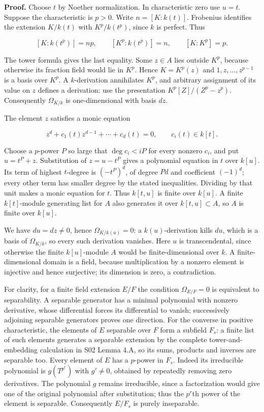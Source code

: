 \documentclass[11pt,a4paper,openany]{report}
\begin{document}
\textbf{Proof.} Choose \(t\) by Noether normalization. In characteristic zero use \(u=t\). Suppose the characteristic is \(p>0\). Write \(n=[K:k(t)]\). Frobenius identifies the extension \(K/k(t)\) with \(K^p/k(t^p)\), since \(k\) is perfect. Thus

\[
[K:k(t^p)]=np,
\qquad [K^p:k(t^p)]=n,
\qquad [K:K^p]=p.
\]

The tower formula gives the last equality. Some \(z\in A\) lies outside \(K^p\), because otherwise its fraction field would lie in \(K^p\). Hence \(K=K^p(z)\) and \(1,z,\ldots,z^{p-1}\) is a basis over \(K^p\). A \(k\)-derivation annihilates \(K^p\), and arbitrary assignment of its value on \(z\) defines a derivation: use the presentation \(K^p[Z]/(Z^p-z^p)\). Consequently \(\Omega_{K/k}\) is one-dimensional with basis \(dz\).

The element \(z\) satisfies a monic equation

\[
z^d+c_1(t)z^{d-1}+\cdots+c_d(t)=0,
\qquad c_i(t)\in k[t].
\]

Choose a \(p\)-power \(P\) so large that \(\deg c_i<iP\) for every nonzero \(c_i\), and put \(u=t^P+z\). Substitution of \(z=u-t^P\) gives a polynomial equation in \(t\) over \(k[u]\). Its term of highest \(t\)-degree is \((-t^P)^d\), of degree \(Pd\) and coefficient \((-1)^d\); every other term has smaller degree by the stated inequalities. Dividing by that unit makes a monic equation for \(t\). Thus \(k[t,u]\) is finite over \(k[u]\). A finite \(k[t]\)-module generating list for \(A\) also generates it over \(k[t,u]\subset A\), so \(A\) is finite over \(k[u]\).

We have \(du=dz\ne0\), hence \(\Omega_{K/k(u)}=0\): a \(k(u)\)-derivation kills \(du\), which is a basis of \(\Omega_{K/k}\), so every such derivation vanishes. Here \(u\) is transcendental, since otherwise the finite \(k[u]\)-module \(A\) would be finite-dimensional over \(k\). A finite-dimensional domain is a field, because multiplication by a nonzero element is injective and hence surjective; its dimension is zero, a contradiction.

For clarity, for a finite field extension \(E/F\) the condition \(\Omega_{E/F}=0\) is equivalent to separability. A separable generator has a minimal polynomial with nonzero derivative, whose differential forces its differential to vanish; successively adjoining separable generators proves one direction. For the converse in positive characteristic, the elements of \(E\) separable over \(F\) form a subfield \(F_s\): a finite list of such elements generates a separable extension by the complete tower-and-embedding calculation in S02 Lemma 4.A, so its sums, products and inverses are separable too. Every element of \(E\) has a \(p\)-power in \(F_s\). Indeed its irreducible polynomial is \(g(T^{p^r})\) with \(g'\ne0\), obtained by repeatedly removing zero derivatives. The polynomial \(g\) remains irreducible, since a factorization would give one of the original polynomial after substitution; thus the \(p^r\)th power of the element is separable. Consequently \(E/F_s\) is purely inseparable.
\end{document}
